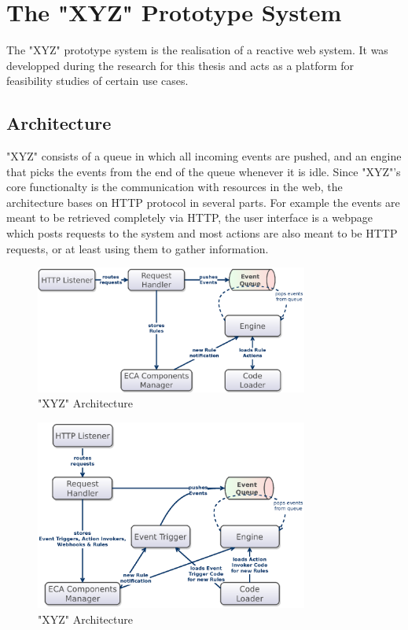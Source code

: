
\chapter{The "XYZ" Prototype System}
%

The "XYZ" prototype system is the realisation of a reactive web system.
It was developped during the research for this thesis and acts as a platform for feasibility studies of certain use cases.




\section{Architecture}
"XYZ" consists of a queue in which all incoming events are pushed, and an engine that picks the events from the end of the queue whenever it is idle.
Since "XYZ"'s core functionalty is the communication with resources in the web, the architecture bases on HTTP protocol in several parts.
For example the events are meant to be retrieved completely via HTTP, the user interface is a webpage which posts requests to the system and most actions are also meant to be HTTP requests, or at least using them to gather information.

\begin{figure}[h!]
	\centering
  \includegraphics[width=0.8\textwidth]{figures/Architecture_woET}
	\caption{"XYZ" Architecture}
	\label{fig:Architecture_woEP}
\end{figure}

\begin{figure}[h!]
	\centering
  \includegraphics[width=0.8\textwidth]{figures/Architecture_wET}
	\caption{"XYZ" Architecture}
	\label{fig:Architecture_wET}
\end{figure}


